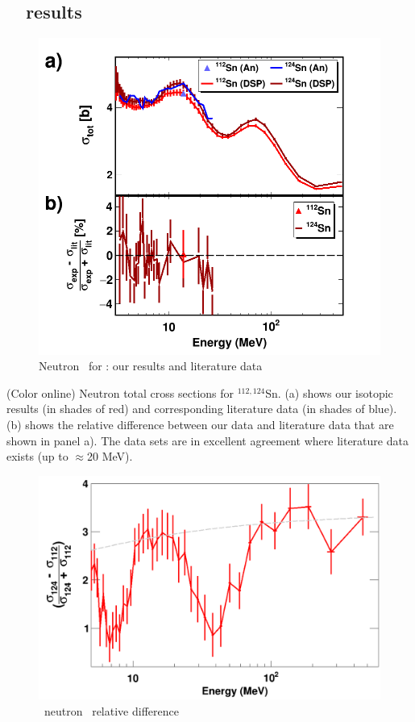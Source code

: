         \cite{Poenitz1983}

\subsection{\snTwelveFour\ \tot\ results}
\begin{figure}
    \includegraphics[scale=0.35]{figures/TwoPanelSn.png}
    \caption{Neutron \tot\ for \snTwelveFour: our results and literature data}
    \label{TwoPanelSn}
\end{figure}

(Color online) Neutron total cross sections for $^{112,124}$Sn.
        (a) shows our isotopic results (in shades of red) and
        corresponding literature data \cite{Harper1982, Timokhov1989, Rapaport1980, Dukarevich1967} (in
        shades of blue). (b) shows the relative difference between our data
        and literature data that are shown in panel a). The data sets are in
    excellent agreement where literature data exists (up to $\approx$20 MeV).

\begin{figure}
    \includegraphics[scale=0.35]{figures/relativeDiff_Sn124Sn112.png}
    \caption{\snTwelveFour\ neutron \tot\ relative difference}
    \label{IsotopicDifferenceSn}
\end{figure}

\afterpage{\clearpage}
